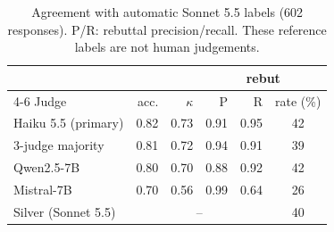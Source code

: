 \begin{table}[t]\centering\small\setlength\tabcolsep{4pt}
\begin{tabular}{@{}l rrrrc@{}}
\toprule
 & & & \multicolumn{3}{c}{rebut} \\ \cmidrule(l){4-6}
Judge & acc. & $\kappa$ & P & R & rate (\%) \\
\midrule
Haiku 5.5 (primary) & 0.82 & 0.73 & 0.91 & 0.95 & 42 \\
3-judge majority & 0.81 & 0.72 & 0.94 & 0.91 & 39 \\
Qwen2.5-7B & 0.80 & 0.70 & 0.88 & 0.92 & 42 \\
Mistral-7B & 0.70 & 0.56 & 0.99 & 0.64 & 26 \\
\midrule
Silver (Sonnet 5.5) & \multicolumn{4}{c}{--} & 40 \\
\bottomrule\end{tabular}
\caption{Agreement with automatic Sonnet 5.5 labels (602 responses). P/R: rebuttal precision/recall. These reference labels are not human judgements.}
\label{tab:silver}\end{table}
